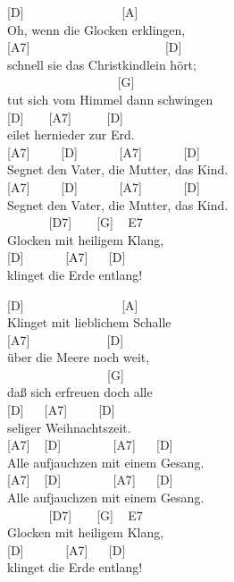 \documentclass[
  letterpaper,
  twoside=false]{scrbook}
\begin{document}
{[}D{]} ~ ~ ~ ~ ~ ~ ~ ~ ~ {[}A{]}\\
Oh, wenn die Glocken erklingen,\\
{[}A7{]} ~ ~ ~ ~ ~ ~ ~ ~ ~ ~ ~ ~ ~{[}D{]}\\
schnell sie das Christkindlein hört;\\
\hspace*{0.333em} ~ ~ ~ ~ ~ ~ ~ ~ ~ ~ ~{[}G{]}\\
tut sich vom Himmel dann schwingen\\
{[}D{]} ~ ~ {[}A7{]} ~ ~ ~ {[}D{]}\\
eilet hernieder zur Erd\textquotesingle.\\
{[}A7{]} ~ ~ ~{[}D{]} ~ ~ ~ ~{[}A7{]} ~ ~ ~ ~{[}D{]}\\
Segnet den Vater, die Mutter, das Kind.\\
{[}A7{]} ~ ~ ~{[}D{]} ~ ~ ~ ~{[}A7{]} ~ ~ ~ ~{[}D{]}\\
Segnet den Vater, die Mutter, das Kind.\\
\hspace*{0.333em} ~ ~ ~ ~ {[}D7{]} ~ ~ {[}G{]} ~ E7\\
Glocken mit heiligem Klang,\\
{[}D{]} ~ ~ ~ ~{[}A7{]} ~ ~{[}D{]}\\
klinget die Erde entlang!

{[}D{]} ~ ~ ~ ~ ~ ~ ~ ~ ~ {[}A{]}\\
Klinget mit lieblichem Schalle\\
{[}A7{]} ~ ~ ~ ~ ~ ~ ~ {[}D{]}\\
über die Meere noch weit,\\
\hspace*{0.333em} ~ ~ ~ ~ ~ ~ ~ ~ ~ ~{[}G{]}\\
daß sich erfreuen doch alle\\
{[}D{]} ~ ~{[}A7{]} ~ ~ ~{[}D{]}\\
seliger Weihnachtszeit.\\
{[}A7{]} ~ {[}D{]} ~ ~ ~ ~ ~{[}A7{]} ~ ~{[}D{]}\\
Alle aufjauchzen mit einem Gesang.\\
{[}A7{]} ~ {[}D{]} ~ ~ ~ ~ ~{[}A7{]} ~ ~{[}D{]}\\
Alle aufjauchzen mit einem Gesang.\\
\hspace*{0.333em} ~ ~ ~ ~ {[}D7{]} ~ ~ {[}G{]} ~ E7\\
Glocken mit heiligem Klang,\\
{[}D{]} ~ ~ ~ ~{[}A7{]} ~ ~{[}D{]}\\
klinget die Erde entlang!
\end{document}
